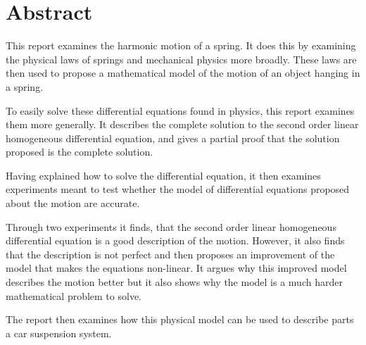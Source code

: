 \section*{Abstract}
\thispagestyle{plain}
This report examines the harmonic motion of a spring. 
It does this by examining the physical laws of springs and mechanical physics more broadly. 
These laws are then used to propose a mathematical model of the motion of an object hanging in a spring.

To easily solve these differential equations found in physics, this report examines them more generally. 
It describes the complete solution to the second order linear homogeneous differential equation, and gives a partial proof that the solution proposed is the complete solution. 

Having explained how to solve the differential equation, it then examines experiments meant to test whether the model of differential equations proposed about the motion are accurate.

Through two experiments it finds, that the second order linear homogeneous differential equation is a good description of the motion.
However, it also finds that the description is not perfect and then proposes an improvement of the model that makes the equations non-linear.
It argues why this improved model describes the motion better but it also shows why the model is a much harder mathematical problem to solve. 

The report then examines how this physical model can be used to describe parts a car suspension system.

